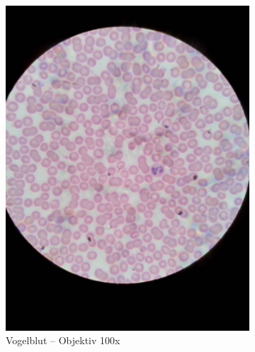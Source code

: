\begin{figure}[h!]
	\begin{subfigure}[b]{0.3\textwidth}
		\includegraphics[width=1\textwidth]{../images/01_human_blood.jpg}
		\caption{Vogelblut -- Objektiv 100x}
	\end{subfigure}
	\begin{subfigure}[b]{0.3\textwidth}

\end{subfigure}
\end{figure}
